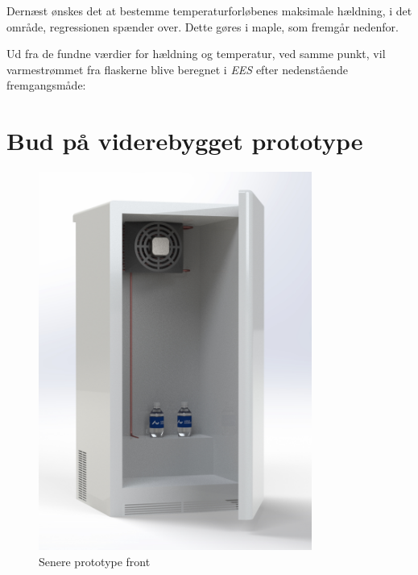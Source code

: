 \documentclass[Hovedrapport.tex]{subfiles}
\begin{document}
Dernæst ønskes det at bestemme temperaturforløbenes maksimale hældning, i det område, regressionen spænder over. Dette gøres i maple, som fremgår nedenfor.

\begin{minipage}{1.0\textwidth}

\end{minipage}




Ud fra de fundne værdier for hældning og temperatur, ved samme punkt, vil varmestrømmet fra flaskerne blive beregnet i \textit{EES} efter nedenstående fremgangsmåde:
\begin{minipage}{1.0\textwidth}

\end{minipage}




\newpage

\section{Bud på viderebygget prototype}
\label{sec:proto1}
\begin{figure}[H]
    \centering
    \includegraphics[width=0.8\textwidth]{Billeder/proto1}
    \caption{Senere prototype front}
    \label{fig:proto1}
\end{figure}
\end{document}
